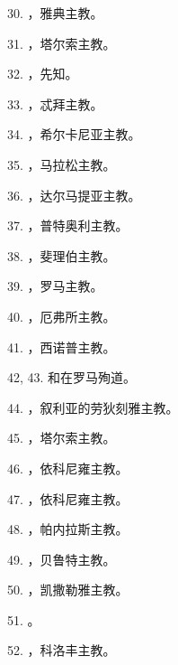 30. ，雅典主教。\par

31. ，塔尔索主教。\par

32. ，先知。\par

33. ，忒拜主教。\par

34. ，希尔卡尼亚主教。\par

35. ，马拉松主教。\par

36. ，达尔马提亚主教。\par

37. ，普特奥利主教。\par

38. ，斐理伯主教。\par

39. ，罗马主教。\par

40. ，厄弗所主教。\par

41. ，西诺普主教。\par

42, 43. 和在罗马殉道。\par

44. ，叙利亚的劳狄刻雅主教。\par

45. ，塔尔索主教。\par

46. ，依科尼雍主教。\par

47. ，依科尼雍主教。\par

48. ，帕内拉斯主教。\par

49. ，贝鲁特主教。\par

50. ，凯撒勒雅主教。\par

51. 。\par

52. ，科洛丰主教。\par

